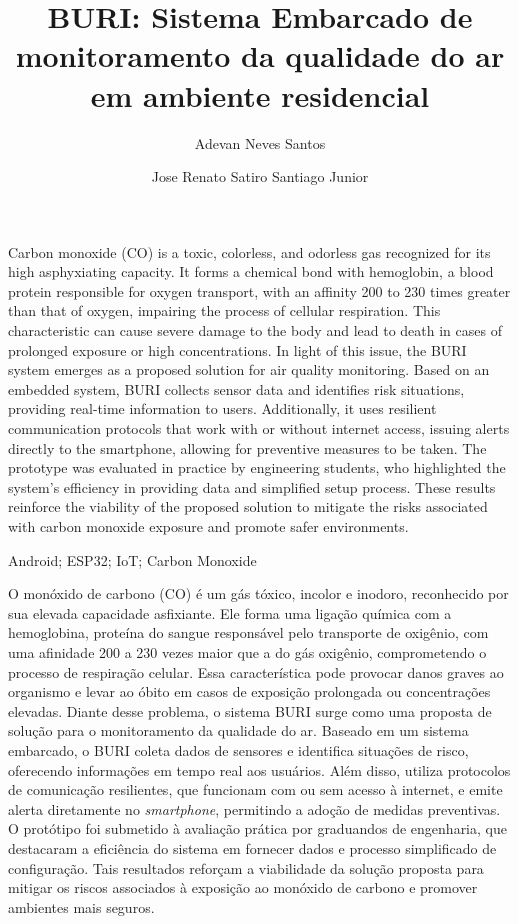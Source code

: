 \documentclass[alpha-refs,brazilian]{RBCA_v3.0}
\title{BURI: Sistema Embarcado de monitoramento da qualidade do ar em ambiente residencial}
\author[1]{Adevan Neves Santos \orcid{0009-0006-2716-5958}}
\author[1]{Jose Renato Satiro Santiago Junior \orcid{0000-0000-0000-0000}}
\affil[1]{Universidade do Estado do Amazonas (UEA)}
\begin{document}
\begin{frontmatter}
	
\maketitle
\thispagestyle{empty}

\begin{Abstract} %
	Carbon monoxide (CO) is a toxic, colorless, and odorless gas recognized for its high asphyxiating capacity. It forms a chemical bond with hemoglobin, a blood protein responsible for oxygen transport, with an affinity 
	200 to 230 times greater than that of oxygen, impairing the process of cellular respiration. This characteristic can cause severe damage to the body and lead to death in cases of prolonged exposure or high concentrations. 
	In light of this issue, the BURI system emerges as a proposed solution for air quality monitoring. Based on an embedded system, BURI collects sensor data and identifies risk situations, providing real-time information to users. 
	Additionally, it uses resilient communication protocols that work with or without internet access, issuing alerts directly to the smartphone, allowing for preventive measures to be taken. The prototype was evaluated in practice 
	by engineering students, who highlighted the system's efficiency in providing data and simplified setup process. These results reinforce the viability of the proposed solution to mitigate the risks associated with carbon monoxide 
	exposure and promote safer environments.
\end{Abstract}

\begin{keywords}
	Android; ESP32; IoT; Carbon Monoxide
\end{keywords}

\begin{resumo} %
	O monóxido de carbono (CO) é um gás tóxico, incolor e inodoro, reconhecido por sua elevada capacidade asfixiante. Ele forma uma ligação química com a hemoglobina, proteína do sangue responsável pelo transporte 
	de oxigênio, com uma afinidade 200 a 230 vezes maior que a do gás oxigênio, comprometendo o processo de respiração celular. Essa característica pode provocar danos graves ao organismo e levar ao óbito em casos 
	de exposição prolongada ou concentrações elevadas. Diante desse problema, o sistema BURI surge como uma proposta de solução para o monitoramento da qualidade do ar. Baseado em um sistema embarcado, o BURI coleta 
	dados de sensores e identifica situações de risco, oferecendo informações em tempo real aos usuários. Além disso, utiliza protocolos de comunicação resilientes, que funcionam com ou sem acesso à internet, e emite 
	alerta diretamente no \textit{smartphone}, permitindo a adoção de medidas preventivas. O protótipo foi submetido à avaliação prática por graduandos de engenharia, que destacaram a eficiência do sistema em fornecer 
	dados e processo simplificado de configuração. Tais resultados reforçam a viabilidade da solução proposta para mitigar os riscos associados à exposição ao monóxido de carbono e promover ambientes mais seguros.
\end{resumo}


\end{frontmatter}
\end{document}
